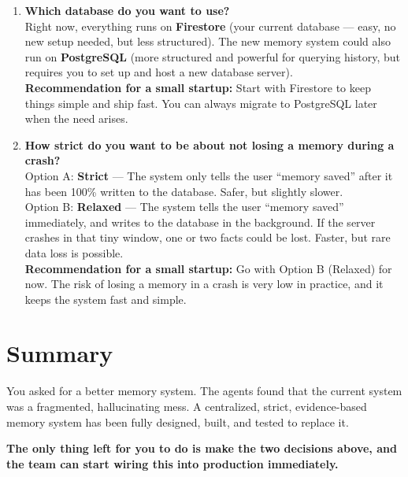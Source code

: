 \documentclass[12pt]{article}
\begin{document}
\begin{enumerate}
    \item \textbf{Which database do you want to use?}
    \\
    Right now, everything runs on \textbf{Firestore} (your current database --- easy, no new setup needed, but less structured). 
    The new memory system could also run on \textbf{PostgreSQL} (more structured and powerful for querying history, but requires you to set up and host a new database server).
    \\
    \textbf{Recommendation for a small startup:} Start with Firestore to keep things simple and ship fast. You can always migrate to PostgreSQL later when the need arises.

    \item \textbf{How strict do you want to be about not losing a memory during a crash?}
    \\
    Option A: \textbf{Strict} --- The system only tells the user ``memory saved'' after it has been 100\% written to the database. Safer, but slightly slower.
    \\
    Option B: \textbf{Relaxed} --- The system tells the user ``memory saved'' immediately, and writes to the database in the background. If the server crashes in that tiny window, one or two facts could be lost. Faster, but rare data loss is possible.
    \\
    \textbf{Recommendation for a small startup:} Go with Option B (Relaxed) for now. The risk of losing a memory in a crash is very low in practice, and it keeps the system fast and simple.
\end{enumerate}

\section{Summary}
You asked for a better memory system. The agents found that the current system was a fragmented, hallucinating mess. A centralized, strict, evidence-based memory system has been fully designed, built, and tested to replace it. 

\textbf{The only thing left for you to do is make the two decisions above, and the team can start wiring this into production immediately.}
\end{document}
